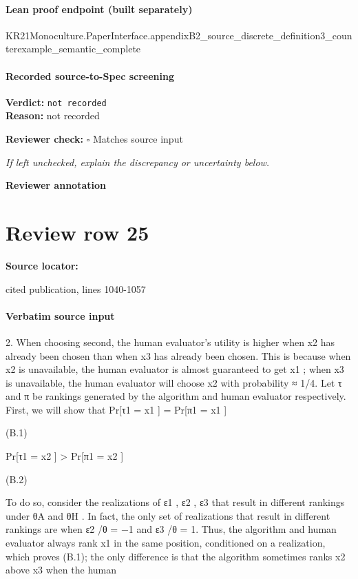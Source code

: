 \documentclass[10pt]{article}
\newcommand{\reviewerbox}{%
  \par\noindent\fbox{\parbox{0.96\linewidth}{\rule{0pt}{0.38in}}}\par
}
\newcommand{\reviewmatch}[1]{%
  \par\noindent\textbf{Reviewer check:} $\square$\; #1\par
  \noindent\emph{If left unchecked, explain the discrepancy or uncertainty below.}\par
}
\begin{document}
\paragraph{Lean proof endpoint (built separately)}\begin{ReviewVerbatim}
KR21Monoculture.PaperInterface.appendixB2_source_discrete_definition3_counterexample_semantic_complete
\end{ReviewVerbatim}

\paragraph{Recorded source-to-Spec screening}
\textbf{Verdict:} \texttt{not recorded}
\\
\textbf{Reason:} not recorded
\reviewmatch{Matches source input}
\noindent\textbf{Reviewer annotation}\par
\reviewerbox
\clearpage
\hypertarget{source-claim-36e8cf848060682f}{}
\section*{Review row 25}
\textbf{Source locator:} {\footnotesize\raggedright cited publication, lines 1040-\allowbreak{}1057\par}
\paragraph{Verbatim source input}
\begin{ReviewVerbatim}
2. When choosing second, the human evaluator’s utility is higher when x2 has already been chosen than
when x3 has already been chosen. This is because when x2 is unavailable, the human evaluator
is almost guaranteed to get x1 ; when x3 is unavailable, the human evaluator will choose x2 with
probability ≈ 1/4.
Let τ and π be rankings generated by the algorithm and human evaluator respectively. First, we will
show that
Pr[τ1 = x1 ] = Pr[π1 = x1 ]

(B.1)

Pr[τ1 = x2 ] > Pr[π1 = x2 ]

(B.2)

To do so, consider the realizations of ε1 , ε2 , ε3 that result in different rankings under θA and θH . In fact,
the only set of realizations that result in different rankings are when ε2 /θ = −1 and ε3 /θ = 1. Thus,
the algorithm and human evaluator always rank x1 in the same position, conditioned on a realization,
which proves (B.1); the only difference is that the algorithm sometimes ranks x2 above x3 when the human
\end{ReviewVerbatim}
\end{document}
